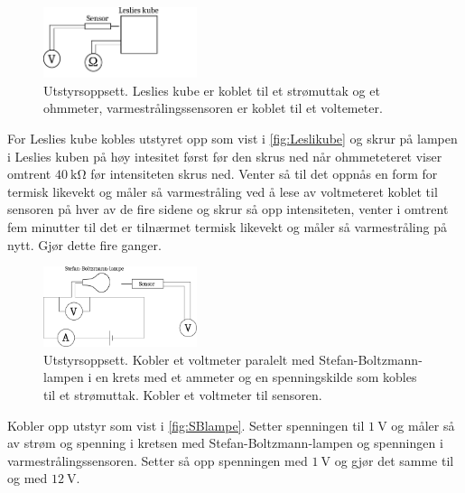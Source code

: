 \begin{figure}
  \centering
  \includegraphics[width=0.4\textwidth]{figures/leslikube.pdf}
  \caption{Utstyrsoppsett. Leslies kube er koblet til et strømuttak og et ohmmeter, varmestrålingssensoren er koblet til et voltemeter.}
  \label{fig:Leslikube}
\end{figure}

For Leslies kube kobles utstyret opp som vist i \autoref{fig:Leslikube} og skrur på lampen i Leslies kuben på høy intesitet først før den skrus ned når ohmmeteteret viser omtrent $\SI{40}{\kilo\ohm}$ før intensiteten skrus ned. Venter så til det oppnås en form for termisk likevekt og måler så varmestråling ved å lese av voltmeteret koblet til sensoren på hver av de fire sidene og skrur så opp intensiteten, venter i omtrent fem minutter til det er tilnærmet termisk likevekt og måler så varmestråling på nytt. Gjør dette fire ganger.

\begin{figure}
  \centering
  \includegraphics[width=0.4\textwidth]{figures/lampe.pdf}
  \caption{Utstyrsoppsett. Kobler et voltmeter paralelt med Stefan-Boltzmann-lampen i en krets med et ammeter og en spenningskilde som kobles til et strømuttak. Kobler et voltmeter til sensoren.}
  \label{fig:SBlampe}
\end{figure}

Kobler opp utstyr som vist i \autoref{fig:SBlampe}. Setter spenningen til $\SI{1}{\volt}$ og måler så av strøm og spenning i kretsen med Stefan-Boltzmann-lampen og spenningen i varmestrålingssensoren. Setter så opp spenningen med $\SI{1}{\volt}$ og gjør det samme til og med $\SI{12}{\volt}$.



